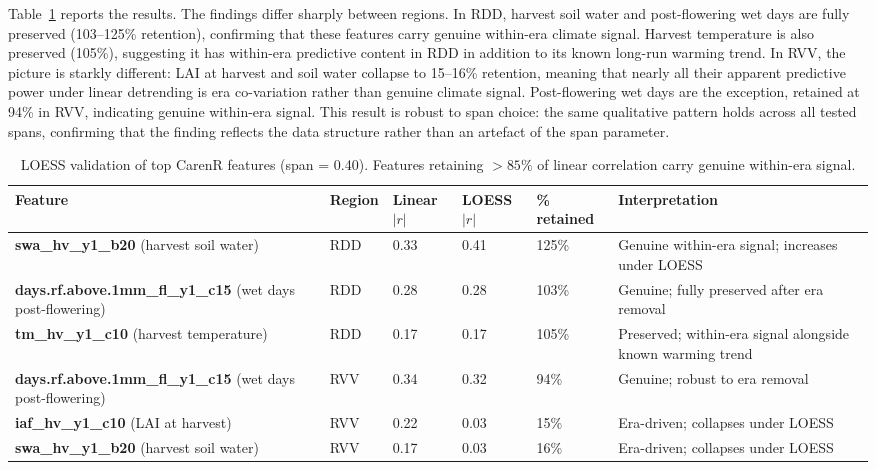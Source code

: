 Table~\ref{tab:ch4a_4} reports the results. The findings differ sharply between regions. In RDD, harvest soil water and post-flowering wet days are fully preserved (103--125\% retention), confirming that these features carry genuine within-era climate signal. Harvest temperature is also preserved (105\%), suggesting it has within-era predictive content in RDD in addition to its known long-run warming trend. In RVV, the picture is starkly different: LAI at harvest and soil water collapse to 15--16\% retention, meaning that nearly all their apparent predictive power under linear detrending is era co-variation rather than genuine climate signal. Post-flowering wet days are the exception, retained at 94\% in RVV, indicating genuine within-era signal. This result is robust to span choice: the same qualitative pattern holds across all tested spans, confirming that the finding reflects the data structure rather than an artefact of the span parameter.

\begin{table}[htbp]
  \centering
  \caption{LOESS validation of top CarenR features (span = 0.40). Features retaining $>85\%$ of linear correlation carry genuine within-era signal.}\label{tab:ch4a_4}
  \small
  \begin{adjustbox}{max width=\textwidth}
    \begin{tabularx}{\textwidth}{p{4.0cm}|l|l|l|l|X}
  \toprule
  Feature & Region & Linear $|r|$ & LOESS $|r|$ & \% retained & Interpretation \\
  \midrule
  \textbf{swa\_hv\_y1\_b20} (harvest soil water)        & RDD & 0.33 & 0.41 & 125\% & Genuine within-era signal; increases under LOESS \\
  \textbf{days.rf.above.1mm\_fl\_y1\_c15} (wet days post-flowering) & RDD & 0.28 & 0.28 & 103\% & Genuine; fully preserved after era removal \\
  \textbf{tm\_hv\_y1\_c10} (harvest temperature)        & RDD & 0.17 & 0.17 & 105\% & Preserved; within-era signal alongside known warming trend \\
  \textbf{days.rf.above.1mm\_fl\_y1\_c15} (wet days post-flowering) & RVV & 0.34 & 0.32 & 94\%  & Genuine; robust to era removal \\
  \textbf{iaf\_hv\_y1\_c10} (LAI at harvest)            & RVV & 0.22 & 0.03 & 15\%  & Era-driven; collapses under LOESS \\
  \textbf{swa\_hv\_y1\_b20} (harvest soil water)        & RVV & 0.17 & 0.03 & 16\%  & Era-driven; collapses under LOESS \\
  \bottomrule
\end{tabularx}
  \end{adjustbox}

\end{table}


